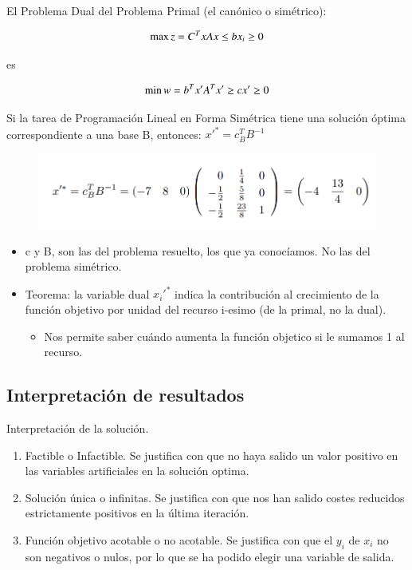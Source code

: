 \documentclass[12pt, twoside, openright]{report} %
\begin{document}
El Problema Dual del Problema Primal (el canónico o simétrico):

\begin{minipage}{.5\linewidth}
	$$\max z = C^{T}x \\  
	Ax\leq b \\ 
	x_{i} \geq 0$$
\end{minipage}
es
\begin{minipage}{.5\linewidth}
	$$\min w = b^{T}x' \\ 
	A^Tx' \geq c \\ 
	x' \geq 0$$
\end{minipage}

Si la tarea de Programación Lineal en Forma Simétrica tiene una
solución óptima correspondiente a una base B, entonces:
\(x'^*= c_B^TB^{-1}\)
\begin{figure}[H]
	{\includegraphics[scale=.4]{Untitled 14.png}}
\end{figure}

\begin{itemize}

	\item c y B, son las del problema resuelto, los que ya conocíamos. No las
	del problema simétrico.
	\item Teorema: la variable dual \(x_i'^*\) indica la contribución al
	crecimiento de la función objetivo por unidad del recurso i-esimo
	(de la primal, no la dual).
	\begin{itemize}
		\item  Nos permite saber cuándo aumenta la función objetico si le sumamos
	1 al recurso.
	\end{itemize}

\end{itemize}

\subsection{Interpretación de resultados}

Interpretación de la solución.

\begin{enumerate}
	\item Factible o Infactible. Se justifica con que no haya salido un valor positivo en las variables artificiales en la solución optima.
	\item Solución única o infinitas. Se justifica con que nos han salido
	costes reducidos estrictamente positivos en la última iteración.
 	\item Función objetivo acotable o no acotable. Se justifica con que el
	\(y_i\) de \(x_i\) no son negativos o nulos, por lo que se ha
	podido elegir una variable de salida.
\end{enumerate}
\end{document}
